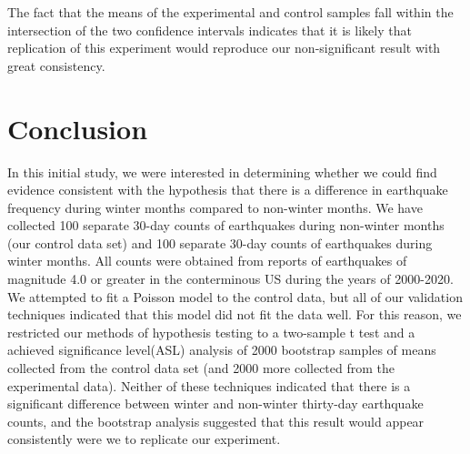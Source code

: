 \documentclass{amsart}
\begin{document}
The fact that the means of the experimental and control samples fall within the intersection of the two confidence intervals indicates that it is likely that replication of this experiment would reproduce our non-significant result with great consistency.
\section{Conclusion}
In this initial study, we were interested in determining whether we could find evidence consistent with the hypothesis that there is a difference in earthquake frequency during winter months compared to non-winter months. We have collected 
100 separate 30-day counts of earthquakes during non-winter months (our control data set) and 100 separate 30-day counts of earthquakes during winter months. All counts were obtained from reports of earthquakes of magnitude 4.0 or greater in the conterminous US during the years of 2000-2020. We attempted to fit a Poisson model to the control data, but all of our validation techniques indicated that this model did not fit the data well. For this reason, we restricted our methods of hypothesis testing to a two-sample t test and a achieved significance level(ASL) analysis of 2000 bootstrap samples of means collected from the control data set (and 2000 more collected from the experimental data). Neither of these techniques indicated that there is a significant difference between winter and non-winter thirty-day earthquake counts, and the bootstrap analysis suggested that this result would appear consistently were we to replicate our experiment.
\end{document}
